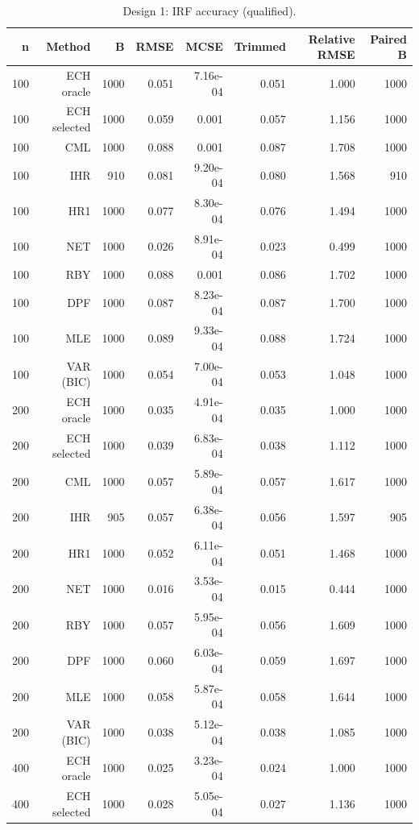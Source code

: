 \begin{table}[p]\centering
\caption{Design 1: IRF accuracy (qualified).}
\small
\begin{tabular}{rrrrrrrr}\toprule
n & Method & B & RMSE & MCSE & Trimmed & Relative RMSE & Paired B \\\midrule
100 & ECH oracle & 1000 & 0.051 & 7.16e-04 & 0.051 & 1.000 & 1000 \\
100 & ECH selected & 1000 & 0.059 & 0.001 & 0.057 & 1.156 & 1000 \\
100 & CML & 1000 & 0.088 & 0.001 & 0.087 & 1.708 & 1000 \\
100 & IHR &  910 & 0.081 & 9.20e-04 & 0.080 & 1.568 &  910 \\
100 & HR1 & 1000 & 0.077 & 8.30e-04 & 0.076 & 1.494 & 1000 \\
100 & NET & 1000 & 0.026 & 8.91e-04 & 0.023 & 0.499 & 1000 \\
100 & RBY & 1000 & 0.088 & 0.001 & 0.086 & 1.702 & 1000 \\
100 & DPF & 1000 & 0.087 & 8.23e-04 & 0.087 & 1.700 & 1000 \\
100 & MLE & 1000 & 0.089 & 9.33e-04 & 0.088 & 1.724 & 1000 \\
100 & VAR (BIC) & 1000 & 0.054 & 7.00e-04 & 0.053 & 1.048 & 1000 \\
200 & ECH oracle & 1000 & 0.035 & 4.91e-04 & 0.035 & 1.000 & 1000 \\
200 & ECH selected & 1000 & 0.039 & 6.83e-04 & 0.038 & 1.112 & 1000 \\
200 & CML & 1000 & 0.057 & 5.89e-04 & 0.057 & 1.617 & 1000 \\
200 & IHR &  905 & 0.057 & 6.38e-04 & 0.056 & 1.597 &  905 \\
200 & HR1 & 1000 & 0.052 & 6.11e-04 & 0.051 & 1.468 & 1000 \\
200 & NET & 1000 & 0.016 & 3.53e-04 & 0.015 & 0.444 & 1000 \\
200 & RBY & 1000 & 0.057 & 5.95e-04 & 0.056 & 1.609 & 1000 \\
200 & DPF & 1000 & 0.060 & 6.03e-04 & 0.059 & 1.697 & 1000 \\
200 & MLE & 1000 & 0.058 & 5.87e-04 & 0.058 & 1.644 & 1000 \\
200 & VAR (BIC) & 1000 & 0.038 & 5.12e-04 & 0.038 & 1.085 & 1000 \\
400 & ECH oracle & 1000 & 0.025 & 3.23e-04 & 0.024 & 1.000 & 1000 \\
400 & ECH selected & 1000 & 0.028 & 5.05e-04 & 0.027 & 1.136 & 1000 \\

\end{tabular}
\end{table}
